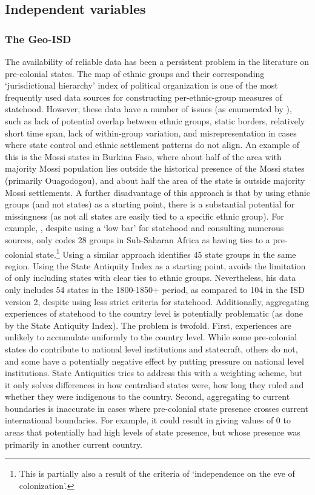 \documentclass[12pt]{article}
\begin{document}
\subsection{Independent variables} \label{Independent variable}

\subsubsection{The Geo-ISD} \label{The Geo-ISD}

The availability of reliable data has been a persistent problem in the
literature on pre-colonial states. The \citet{Murdock1967} map of ethnic groups
and their corresponding `jurisdictional hierarchy' index of political
organization is one of the most frequently used data sources for constructing
per-ethnic-group measures of statehood. However, these data have a number of
issues (as enumerated by \citet{Michalopoulos2018}), such as lack of potential
overlap between ethnic groups, static borders, relatively short time span, lack
of within-group variation, and misrepresentation in cases where state control
and ethnic settlement patterns do not align. An example of this is the Mossi
states in Burkina Faso, where about half of the area with majority Mossi
population lies outside the historical presence of the Mossi states (primarily
Ouagodogou), and about half the area of the state is outside majority Mossi
settlements. A further disadvantage of this approach is that by using ethnic
groups (and not states) as a starting point, there is a substantial potential
for missingness (as not all states are easily tied to a specific ethnic group).
For example, \citet{Paine2019}, despite using a `low bar' for statehood and
consulting numerous sources, only codes 28 groups in Sub-Saharan Africa as
having ties to a pre-colonial state.\footnote{This is partially also a result of
the criteria of `independence on the eve of colonization'.} Using a similar
approach \citet{Wig2016} identifies 45 state groups in the same region. Using
the State Antiquity Index \citep{Bockstette2002} as a starting point,
\citet{Depetris-Chauvin2016} avoids the limitation of only including states with
clear ties to ethnic groups. Nevertheless, his data only includes 54 states in
the 1800-1850+ period, as compared to 104 in the ISD version 2, despite using
less strict criteria for statehood. Additionally, aggregating experiences of
statehood to the country level is potentially problematic (as done by the State
Antiquity Index). The problem is twofold. First, experiences are unlikely to
accumulate uniformly to the country level. While some pre-colonial states do
contribute to national level institutions and statecraft, others do not, and
some have a potentially negative effect by putting pressure on national level
institutions. State Antiquities tries to address this with a weighting scheme,
but it only solves differences in how centralised states were, how long they
ruled and whether they were indigenous to the country. Second, aggregating to
current boundaries is inaccurate in cases where pre-colonial state presence
crosses current international boundaries. For example, it could result in giving
values of 0 to areas that potentially had high levels of state presence, but
whose presence was primarily in another current country.
\end{document}
